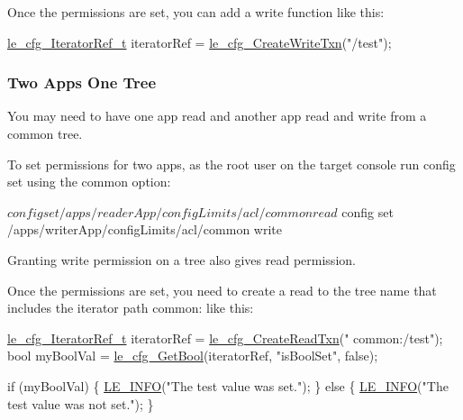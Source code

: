 Once the permissions are set, you can add a write function like this\+:


\begin{DoxyCode}
\hyperlink{le__cfg__interface_8h_a646829934bb23a878e19ade2c3e01eba}{le\_cfg\_IteratorRef\_t} iteratorRef = \hyperlink{le__cfg__interface_8h_a9c817e5edf0df97034fdc432ce8d0f18}{le\_cfg\_CreateWriteTxn}(\textcolor{stringliteral}{"/test"});
\end{DoxyCode}
\hypertarget{how_to_config_tree_transactions_howToConfigTree_twoApps}{}\subsubsection{Two Apps One Tree}\label{how_to_config_tree_transactions_howToConfigTree_twoApps}
You may need to have one app read and another app read and write from a common tree.

To set permissions for two apps, as the root user on the target console run {\ttfamily config set} using the {\ttfamily common} option\+:


\begin{DoxyCode}
$ config set /apps/readerApp/configLimits/acl/common read
$ config set /apps/writerApp/configLimits/acl/common write
\end{DoxyCode}


Granting write permission on a tree also gives read permission.

Once the permissions are set, you need to create a read to the tree name that includes the iterator path {\ttfamily common\+:} like this\+:


\begin{DoxyCode}
\hyperlink{le__cfg__interface_8h_a646829934bb23a878e19ade2c3e01eba}{le\_cfg\_IteratorRef\_t} iteratorRef = \hyperlink{le__cfg__interface_8h_aa766bff3a3ddbd2769b903fc56f6d9d2}{le\_cfg\_CreateReadTxn}(\textcolor{stringliteral}{"
      common:/test"});
\textcolor{keywordtype}{bool} myBoolVal = \hyperlink{le__cfg__interface_8h_aa3898fcb0d62b03c9a238d36b42d7a63}{le\_cfg\_GetBool}(iteratorRef, \textcolor{stringliteral}{"isBoolSet"}, \textcolor{keyword}{false});

\textcolor{keywordflow}{if} (myBoolVal)
\{
    \hyperlink{le__log_8h_a23e6d206faa64f612045d688cdde5808}{LE\_INFO}(\textcolor{stringliteral}{"The test value was set."});
\}
\textcolor{keywordflow}{else}
\{
    \hyperlink{le__log_8h_a23e6d206faa64f612045d688cdde5808}{LE\_INFO}(\textcolor{stringliteral}{"The test value was not set."});
\}
\end{DoxyCode}


